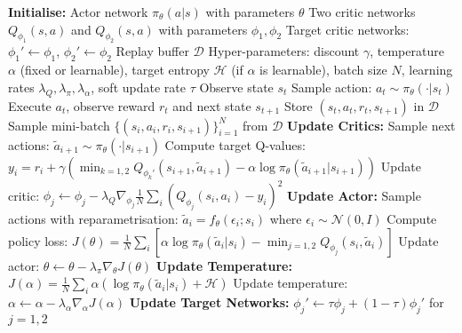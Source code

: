 \begin{algorithmic}
\State \textbf{Initialise:}
\State \quad Actor network $\pi_\theta(a|s)$ with parameters $\theta$
\State \quad Two critic networks $Q_{\phi_1}(s,a)$ and $Q_{\phi_2}(s,a)$ with parameters $\phi_1, \phi_2$
\State \quad Target critic networks: $\phi_1' \leftarrow \phi_1$, $\phi_2' \leftarrow \phi_2$
\State \quad Replay buffer $\mathcal{D}$
\State \quad Hyper-parameters: discount $\gamma$, temperature $\alpha$ (fixed or learnable), target entropy $\mathcal{H}$ (if $\alpha$ is learnable), batch size $N$, learning rates $\lambda_Q, \lambda_\pi, \lambda_\alpha$, soft update rate $\tau$
    \State Observe state $s_t$
    \State Sample action: $a_t \sim \pi_\theta(\cdot | s_t)$
    \State Execute $a_t$, observe reward $r_t$ and next state $s_{t+1}$
    \State Store $(s_t, a_t, r_t, s_{t+1})$ in $\mathcal{D}$
        \State Sample mini-batch $\{(s_i, a_i, r_i, s_{i+1})\}_{i=1}^N$ from $\mathcal{D}$
        \State \textbf{Update Critics:}
            \State Sample next actions: $\tilde{a}_{i+1} \sim \pi_\theta(\cdot | s_{i+1})$
            \State Compute target Q-values:
            \State \quad $y_i = r_i + \gamma \left(\min_{k=1,2} Q_{\phi_k'}(s_{i+1}, \tilde{a}_{i+1}) - \alpha \log \pi_\theta(\tilde{a}_{i+1} | s_{i+1})\right)$
            \State Update critic: $\phi_j \leftarrow \phi_j - \lambda_Q \nabla_{\phi_j} \frac{1}{N}\sum_i (Q_{\phi_j}(s_i, a_i) - y_i)^2$
        \EndFor
        \State \textbf{Update Actor:}
        \State Sample actions with reparametrisation: $\tilde{a}_i = f_\theta(\epsilon_i; s_i)$ where $\epsilon_i \sim \mathcal{N}(0, I)$
        \State Compute policy loss:
        \State \quad $J(\theta) = \frac{1}{N}\sum_i \left[\alpha \log \pi_\theta(\tilde{a}_i | s_i) - \min_{j=1,2} Q_{\phi_j}(s_i, \tilde{a}_i)\right]$
        \State Update actor: $\theta \leftarrow \theta - \lambda_\pi \nabla_\theta J(\theta)$
            \State \textbf{Update Temperature:}
            \State $J(\alpha) = \frac{1}{N}\sum_i \alpha \left(\log \pi_\theta(\tilde{a}_i | s_i) + \mathcal{H}\right)$
            \State Update temperature: $\alpha \leftarrow \alpha - \lambda_\alpha \nabla_\alpha J(\alpha)$
        \EndIf
        \State \textbf{Update Target Networks:}
        \State $\phi_j' \leftarrow \tau \phi_j + (1-\tau) \phi_j'$ for $j = 1, 2$
    \EndIf
\EndFor
\end{algorithmic}